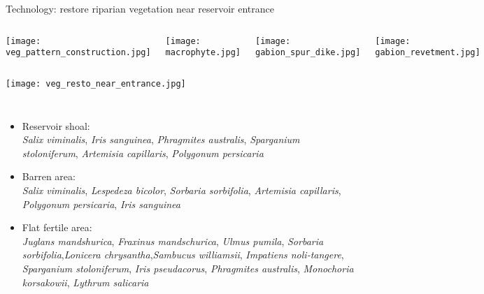 \begin{frame}{Technology: restore riparian vegetation near reservoir entrance}
\vspace{-0.2cm}
\begin{columns}[T,onlytextwidth]
	
	\texttt{[image: veg\_pattern\_construction.jpg]}
	
	\texttt{[image: macrophyte.jpg]}
	
	\texttt{[image: gabion\_spur\_dike.jpg]}
	
	\texttt{[image: gabion\_revetment.jpg]}
\end{columns}
\vspace{-0.2cm}
\texttt{[image: veg\_resto\_near\_entrance.jpg]}

%
\vspace{-0.4cm}
\begin{columns}[T,onlytextwidth]
	
	\begin{itemize}
		\small
		\item Reservoir shoal:\\
		\tiny
		\emph{Salix viminalis}, \textcolor{colherb}{\emph{Iris sanguinea}}, \textcolor{colherb}{\emph{Phragmites australis}}, \textcolor{colherb}{\emph{Sparganium stoloniferum}}, \textcolor{colherb}{\emph{Artemisia capillaris}}, \textcolor{colherb}{\emph{Polygonum persicaria}}\\
		\small
		\item Barren area:\\
		\tiny
		\emph{Salix viminalis}, \textcolor{colshrub}{\emph{Lespedeza bicolor}}, \textcolor{colshrub}{\emph{Sorbaria sorbifolia}}, \textcolor{colherb}{\emph{Artemisia capillaris}}, \textcolor{colherb}{\emph{Polygonum persicaria}}, \textcolor{colherb}{\emph{Iris sanguinea}}\\
		
		\small
		\item Flat fertile area:\\
		\tiny
		\emph{Juglans mandshurica}, \emph{Fraxinus mandschurica}, \emph{Ulmus pumila},
		\textcolor{colshrub}{\emph{Sorbaria sorbifolia}},\textcolor{colshrub}{\emph{Lonicera chrysantha}},\textcolor{colshrub}{\emph{Sambucus williamsii}}, \textcolor{colherb}{\emph{Impatiens noli-tangere}}, \textcolor{colherb}{\emph{Sparganium stoloniferum}}, \textcolor{colherb}{\emph{Iris pseudacorus}}, \textcolor{colherb}{\emph{Phragmites australis}}, \textcolor{colherb}{\emph{Monochoria korsakowii}}, \textcolor{colherb}{\emph{Lythrum salicaria}}\\
		

\end{itemize}
\end{columns}
\end{frame}

